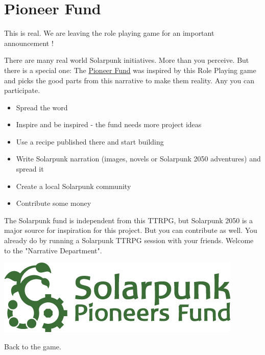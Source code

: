 \chapter{Pioneer Fund}
\label{ch:pioneer fund}

This is real. We are leaving the role playing game for an important announcement !

There are many real world Solarpunk initiatives. More than you perceive. But there is a special one: The \href{https://www.solarpunk-pioneers.org/dev/}{Pioneer Fund} was inspired by this Role Playing game and picks the good parts from this narrative to make them reality. Any you can participate.

\begin{itemize}
    \item {Spread the word}
    \item {Inspire and be inspired - the fund needs more project ideas}
    \item {Use a recipe published there and start building}
    \item {Write Solarpunk narration (images, novels or Solarpunk 2050 adventures) and spread it}
    \item {Create a local Solarpunk community}
    \item {Contribute some money }
\end{itemize}

The Solarpunk fund is independent from this TTRPG, but Solarpunk 2050 is a major source for inspiration for this project. But you can contribute as well. You already do by running a Solarpunk TTRPG session with your friends.
Welcome to the "Narrative Department".
\begin{center}
    \href{https://www.solarpunk-pioneers.org/dev/}{
    \includegraphics[scale=0.5]{static/SPF_logo_wide.png}
    }
\end{center}

Back to the game.
